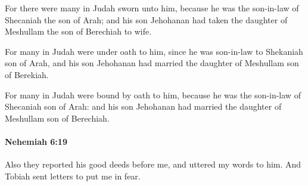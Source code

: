 			\begin{versebox}
					\item[BHS] 
					\item[LXX] 
					\item[ASV] For there were many in Judah sworn unto him, because he was the son-in-law of Shecaniah the son of Arah; and his son Jehohanan had taken the daughter of Meshullam the son of Berechiah to wife.
					\item[NIV] For many in Judah were under oath to him, since he was son-in-law to Shekaniah son of Arah, and his son Jehohanan had married the daughter of Meshullam son of Berekiah.
					\item[NRSV] For many in Judah were bound by oath to him, because he was the son-in-law of Shecaniah son of Arah: and his son Jehohanan had married the daughter of Meshullam son of Berechiah.
			\end{versebox}

		\paragraph{Nehemiah 6:19} %
			\label{NEHEMIAH-6-19}

			Also they reported his good deeds before me, and uttered my words to him. And Tobiah sent letters to put me in fear.

